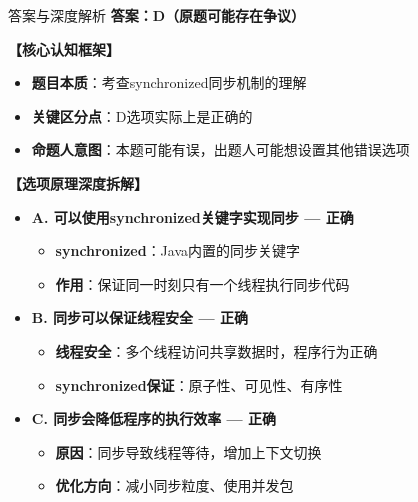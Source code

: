 \documentclass[12pt, a4paper]{ctexart}
\begin{document}
\begin{enumerate}[label=\textbf{\arabic*.}]
	      \begin{bluebox}{答案与深度解析}
		      \textbf{答案：D（原题可能存在争议）}

		      \textbf{【核心认知框架】}
		      \begin{itemize}[label={}, leftmargin=*, nosep]
			      \item \textbf{题目本质}：考查synchronized同步机制的理解
			      \item \textbf{关键区分点}：D选项实际上是正确的
			      \item \textbf{命题人意图}：本题可能有误，出题人可能想设置其他错误选项
		      \end{itemize}

		      \textbf{【选项原理深度拆解】}
					  \begin{itemize}[label={}, leftmargin=*, nosep]

		      \item \textbf{A. 可以使用synchronized关键字实现同步 — 正确}
		      \begin{itemize}[label={}, leftmargin=*, nosep]
			      \item \textbf{synchronized}：Java内置的同步关键字
			      \item \textbf{作用}：保证同一时刻只有一个线程执行同步代码
		      \end{itemize}

		      \item \textbf{B. 同步可以保证线程安全 — 正确}
		      \begin{itemize}[label={}, leftmargin=*, nosep]
			      \item \textbf{线程安全}：多个线程访问共享数据时，程序行为正确
			      \item \textbf{synchronized保证}：原子性、可见性、有序性
		      \end{itemize}

		      \item \textbf{C. 同步会降低程序的执行效率 — 正确}
		      \begin{itemize}[label={}, leftmargin=*, nosep]
			      \item \textbf{原因}：同步导致线程等待，增加上下文切换
			      \item \textbf{优化方向}：减小同步粒度、使用并发包
		      \end{itemize}


\end{itemize}
\end{bluebox}
\end{enumerate}
\end{document}
